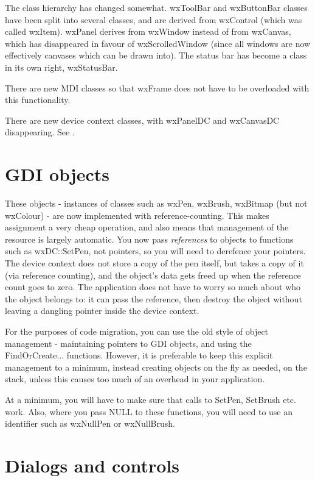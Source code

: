The class hierarchy has changed somewhat. wxToolBar and wxButtonBar
classes have been split into several classes, and are derived from wxControl (which was
called wxItem). wxPanel derives from wxWindow instead of from wxCanvas, which has
disappeared in favour of wxScrolledWindow (since all windows are now effectively canvases
which can be drawn into). The status bar has become a class in its own right, wxStatusBar.

There are new MDI classes so that wxFrame does not have to be overloaded with this
functionality.

There are new device context classes, with wxPanelDC and wxCanvasDC disappearing.
See .

\chapter{GDI objects}\label{gdiobjects}

These objects - instances of classes such as wxPen, wxBrush, wxBitmap (but not wxColour) -
are now implemented with reference-counting. This makes assignment a very cheap operation,
and also means that management of the resource is largely automatic. You now pass {\it references} to
objects to functions such as wxDC::SetPen, not pointers, so you will need to derefence your pointers.
The device context does not store a copy of the pen
itself, but takes a copy of it (via reference counting), and the object's data gets freed up
when the reference count goes to zero. The application does not have to worry so much about
who the object belongs to: it can pass the reference, then destroy the object without
leaving a dangling pointer inside the device context.

For the purposes of code migration, you can use the old style of object management - maintaining
pointers to GDI objects, and using the FindOrCreate... functions. However, it is preferable to
keep this explicit management to a minimum, instead creating objects on the fly as needed, on the stack,
unless this causes too much of an overhead in your application.

At a minimum, you will have to make sure that calls to SetPen, SetBrush etc. work. Also, where you pass NULL to these
functions, you will need to use an identifier such as wxNullPen or wxNullBrush.

\chapter{Dialogs and controls}\label{dialogscontrols}

